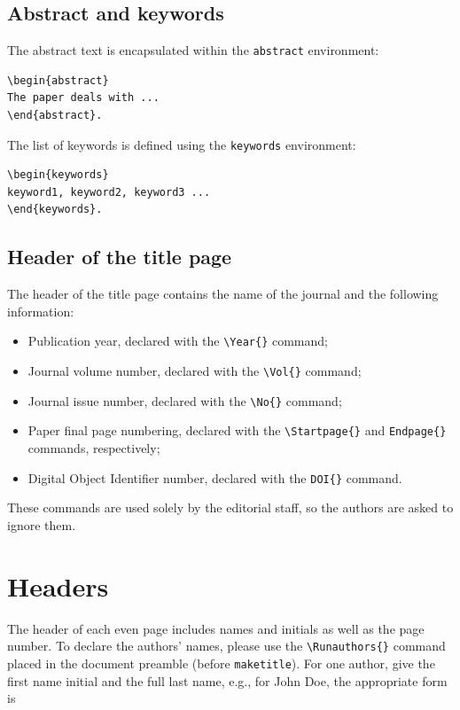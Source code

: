 \documentclass{amcs}
\begin{document}
\subsection{Abstract and keywords}
The abstract text is encapsulated within the \verb+abstract+ environment:

{\small \begin{verbatim}
\begin{abstract}
The paper deals with ...
\end{abstract}.
\end{verbatim}}

\noindent The list of keywords is defined using the \verb+keywords+ environment:

{\small \begin{verbatim}
\begin{keywords}
keyword1, keyword2, keyword3 ...
\end{keywords}.
\end{verbatim}}

\subsection{Header of the title page}
The header of the title page contains the name of the journal and the following information:
\begin{itemize}
  \item
    Publication year, declared with the \verb+\Year{}+ command;
  \item
    Journal volume number, declared with the \verb+\Vol{}+ command;
  \item
    Journal issue number, declared with the \verb+\No{}+ command;
  \item
    Paper final page numbering, declared with the \verb+\Startpage{}+ and \verb+Endpage{}+ commands, respectively;
  \item
    Digital Object Identifier number, declared with the \verb+DOI{}+ command.
\end{itemize}
These commands are used solely by the editorial staff, so the authors are asked to ignore them.

\section{Headers}
The header of each even page includes names and initials as well as the page number. To declare the authors' names, please use the \verb+\Runauthors{}+ command placed in the document preamble (before \verb+maketitle+). For one author, give the first name initial and the full last name, e.g., for John Doe, the appropriate form is
\end{document}
